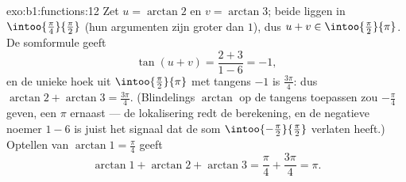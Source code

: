 \begin{solution}{exo:b1:functions:12}
Zet $u = \arctan 2$ en $v = \arctan 3$; beide liggen in
$\intoo{\frac\pi4}{\frac\pi2}$ (hun argumenten zijn groter dan $1$),
dus $u + v \in \intoo{\frac\pi2}{\pi}$. De somformule geeft
\[
\tan(u + v) = \frac{2 + 3}{1 - 6} = -1 ,
\]
en de unieke hoek uit $\intoo{\frac\pi2}{\pi}$ met tangens $-1$ is
$\frac{3\pi}4$: dus $\arctan 2 + \arctan 3 = \frac{3\pi}4$. (Blindelings
$\arctan$ op de tangens toepassen zou $-\frac\pi4$ geven, een $\pi$
ernaast --- de lokalisering redt de berekening, en de negatieve noemer
$1 - 6$ is juist het signaal dat de som
$\intoo{-\frac\pi2}{\frac\pi2}$ verlaten heeft.) Optellen van $\arctan 1
= \frac\pi4$ geeft
\[
\arctan 1 + \arctan 2 + \arctan 3 = \frac\pi4 + \frac{3\pi}4 = \pi .
\]
\end{solution}

